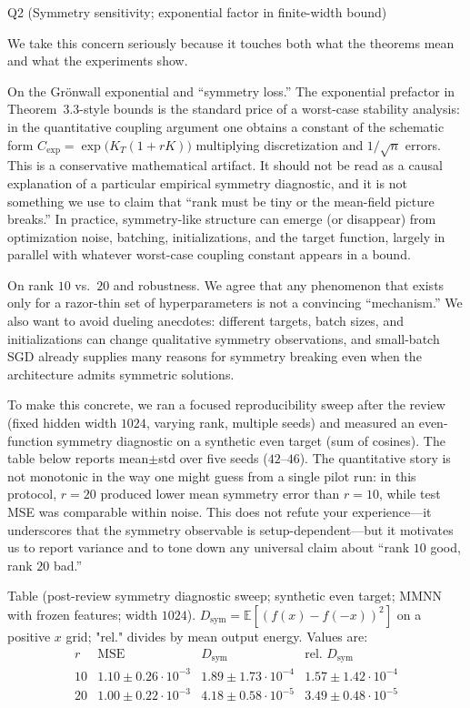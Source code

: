 Q2 (Symmetry sensitivity; exponential factor in finite-width bound)

We take this concern seriously because it touches both what the theorems mean and what the experiments show.

On the Gr\"onwall exponential and ``symmetry loss.'' The exponential prefactor in Theorem~3.3-style bounds is the standard price of a worst-case stability analysis: in the quantitative coupling argument one obtains a constant of the schematic form $C_{\exp}=\exp\bigl(K_T(1+rK)\bigr)$ multiplying discretization and $1/\sqrt{n}$ errors. This is a conservative mathematical artifact. It should not be read as a causal explanation of a particular empirical symmetry diagnostic, and it is not something we use to claim that ``rank must be tiny or the mean-field picture breaks.'' In practice, symmetry-like structure can emerge (or disappear) from optimization noise, batching, initializations, and the target function, largely in parallel with whatever worst-case coupling constant appears in a bound.

On rank $10$ vs.\ $20$ and robustness. We agree that any phenomenon that exists only for a razor-thin set of hyperparameters is not a convincing ``mechanism.'' We also want to avoid dueling anecdotes: different targets, batch sizes, and initializations can change qualitative symmetry observations, and small-batch SGD already supplies many reasons for symmetry breaking even when the architecture admits symmetric solutions.

To make this concrete, we ran a focused reproducibility sweep after the review (fixed hidden width $1024$, varying rank, multiple seeds) and measured an even-function symmetry diagnostic on a synthetic even target (sum of cosines). The table below reports mean$\pm$std over five seeds ($42$--$46$). The quantitative story is not monotonic in the way one might guess from a single pilot run: in this protocol, $r=20$ produced lower mean symmetry error than $r=10$, while test MSE was comparable within noise. This does not refute your experience---it underscores that the symmetry observable is setup-dependent---but it motivates us to report variance and to tone down any universal claim about ``rank $10$ good, rank $20$ bad.''

Table (post-review symmetry diagnostic sweep; synthetic even target; MMNN with frozen features; width $1024$). $D_{\mathrm{sym}}=\mathbb{E}[(f(x)-f(-x))^2]$ on a positive $x$ grid; "rel." divides by mean output energy. Values are:
$$
\begin{array}{c|c|c|c}
r & \text{MSE} & D_{\mathrm{sym}} & \text{rel. }D_{\mathrm{sym}} \\
\hline
10 & 1.10\pm0.26\cdot10^{-3} & 1.89\pm1.73\cdot10^{-4} & 1.57\pm1.42\cdot10^{-4} \\
20 & 1.00\pm0.22\cdot10^{-3} & 4.18\pm0.58\cdot10^{-5} & 3.49\pm0.48\cdot10^{-5}
\end{array}
$$

